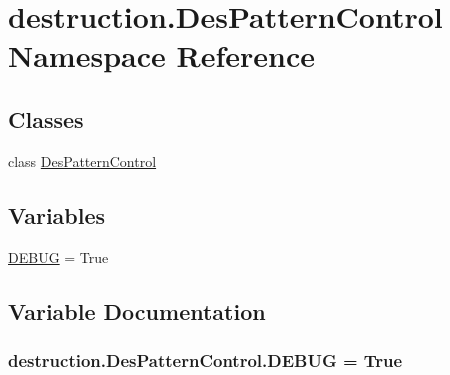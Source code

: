 \hypertarget{namespacedestruction_1_1_des_pattern_control}{\section{destruction.\-Des\-Pattern\-Control Namespace Reference}
\label{namespacedestruction_1_1_des_pattern_control}
}
\subsection*{Classes}
\begin{DoxyCompactItemize}
\item 
class \hyperlink{classdestruction_1_1_des_pattern_control_1_1_des_pattern_control}{Des\-Pattern\-Control}
\end{DoxyCompactItemize}
\subsection*{Variables}
\begin{DoxyCompactItemize}
\item 
\hyperlink{namespacedestruction_1_1_des_pattern_control_acafc9b62cc1b7b3e012b1317315adf5c}{D\-E\-B\-U\-G} = True
\end{DoxyCompactItemize}


\subsection{Variable Documentation}
\hypertarget{namespacedestruction_1_1_des_pattern_control_acafc9b62cc1b7b3e012b1317315adf5c}{
\subsubsection[{D\-E\-B\-U\-G}]{\setlength{\rightskip}{0pt plus 5cm}destruction.\-Des\-Pattern\-Control.\-D\-E\-B\-U\-G = True}}\label{namespacedestruction_1_1_des_pattern_control_acafc9b62cc1b7b3e012b1317315adf5c}
